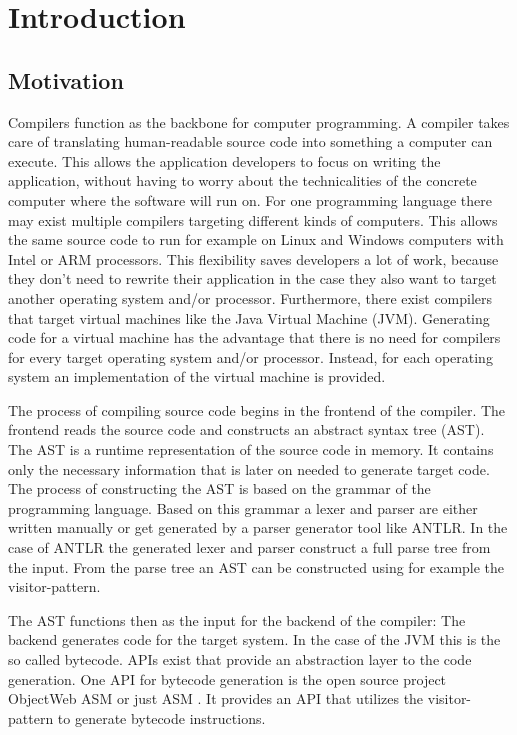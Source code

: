 \chapter{Introduction}
\label{cha:introduction}

\section{Motivation}

Compilers function as the backbone for computer programming. A compiler takes care of translating human-readable source code into something a computer can execute. This allows the application developers to focus on writing the application, without having to worry about the technicalities of the concrete computer where the software will run on. For one programming language there may exist multiple compilers targeting different kinds of computers. This allows the same source code to run for example on Linux and Windows computers with Intel or ARM processors. This flexibility saves developers a lot of work, because they don't need to rewrite their application in the case they also want to target another operating system and/or processor. Furthermore, there exist compilers that target virtual machines like the Java Virtual Machine (JVM). Generating code for a virtual machine has the advantage that there is no need for compilers for every target operating system and/or processor. Instead, for each operating system an implementation of the virtual machine is provided.

The process of compiling source code begins in the frontend of the compiler. The frontend reads the source code and constructs an abstract syntax tree (AST). The AST is a runtime representation of the source code in memory. It contains only the necessary information that is later on needed to generate target code. The process of constructing the AST is based on the grammar of the programming language. Based on this grammar a lexer and parser are either written manually or get generated by a parser generator tool like ANTLR. In the case of ANTLR the generated lexer and parser construct a full parse tree from the input. From the parse tree an AST can be constructed using for example the visitor-pattern. 

The AST functions then as the input for the backend of the compiler: The backend generates code for the target system. In the case of the JVM this is the so called bytecode. 
 APIs exist that provide an abstraction layer to the code generation. One API for bytecode generation is the open source project ObjectWeb ASM or just ASM \parencite{bruneton2007asm}. It provides an API that utilizes the visitor-pattern to generate bytecode instructions. 


